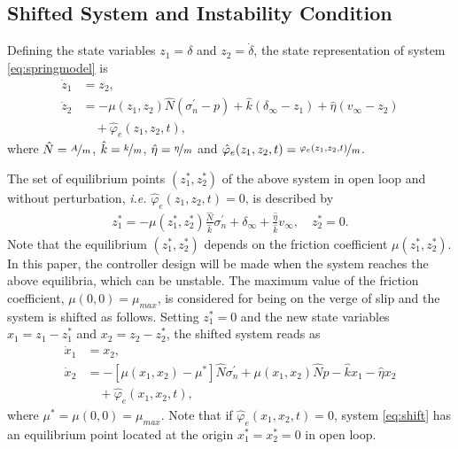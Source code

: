 \documentclass[journal,twoside,web]{ieeecolor}
\begin{document}
\subsection{Shifted System and Instability Condition} 

Defining the state variables $z_1=\delta$ and $z_2=\dot{\delta}$, the state representation of system \eqref{eq:springmodel} is 
\begin{equation*}
\begin{split}
  \dot{z}_1&=z_2,\\
  \dot{z}_2&=-\mu(z_1,z_2)\hat{N}(\sigma_n^\prime-p) + \hat{k}(\delta_\infty-z_1) + \hat{\eta}(v_\infty-z_2) \\ &\quad+\hat{\varphi}_e(z_1,z_2,t),
\end{split}  
\end{equation*}
where $\hat{N}=\nicefrac{A}{m}$, $\hat{k}=\nicefrac{k}{m}$, $\hat{\eta}=\nicefrac{\eta}{m}$ and $\hat{\varphi}_e(z_1,z_2,t)=\nicefrac{\varphi_e(z_1,z_2,t)}{m}$.

The set of equilibrium points $(z_1^*,z_2^*)$ of the above system in open loop and without perturbation, \textit{i.e.} $\hat{\varphi}_e(z_1,z_2,t)=0$, is described by
\begin{equation*}
\begin{split}
  z_1^* = -\mu(z_1^*,z_2^*)\frac{\hat{N}}{\hat{k}}\sigma_n^\prime + \delta_\infty + \frac{\hat{\eta}}{\hat{k}}v_\infty, \quad
  z_2^* = 0.
\end{split}
\end{equation*}
Note that the equilibrium $(z_1^*,z_2^*)$ depends on the friction coefficient $\mu(z_1^*,z_2^*)$. In this paper, the controller design will be made when the system reaches the above equilibria, which can be unstable. The maximum value of the friction coefficient, $\mu(0,0) = \mu_{max}$, is considered for being on the verge of slip and the system is shifted as follows. Setting $z_1^*=0$ and the new state variables $x_1 = z_1-z_1^*$ and $x_2 = z_2-z_2^*$, the shifted system reads as
\begin{equation}
\begin{split}
  \dot{x}_1&=x_2,\\
  \dot{x}_2&=-[\mu(x_1,x_2)-\mu^*]\hat{N}\sigma_n^\prime + \mu(x_1,x_2)\hat{N} p -\hat{k}x_1 - \hat{\eta}x_2 \\ &\quad + \hat{\varphi}_e(x_1,x_2,t),
\end{split}  
\label{eq:shift}
\end{equation}
where $\mu^* = \mu(0,0) = \mu_{max}$. Note that if $\hat{\varphi}_e(x_1,x_2,t)=0$, system \eqref{eq:shift} has an equilibrium point located at the origin $x_1^*=x_2^*=0$ in open loop. 
\end{document}
